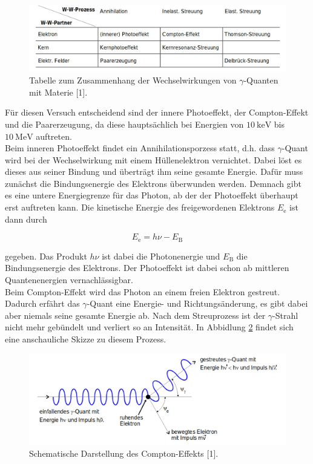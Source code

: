\begin{figure}
  \centering
  \includegraphics[scale=0.3]{content/WW.jpg}
  \caption{Tabelle zum Zusammenhang der Wechselwirkungen von $\gamma$-Quanten mit Materie [1].}
  \label{fig:WW}
\end{figure}

Für diesen Versuch entscheidend sind der innere Photoeffekt, der Compton-Effekt 
und die Paarerzeugung, da diese hauptsächlich bei Energien von $\SI{10}{\kilo\eV}$ bis 
$\SI{10}{\mega\eV}$ auftreten.\\

Beim inneren Photoeffekt findet ein Annihilationsporzess statt, d.h. dass 
$\gamma$-Quant wird bei der Wechselwirkung mit einem Hüllenelektron vernichtet. Dabei 
löst es dieses aus seiner Bindung und überträgt ihm seine gesamte Energie. Dafür 
muss zunächst die Bindungsenergie des Elektrons überwunden werden. Demnach gibt es 
eine untere Energiegrenze für das Photon, ab der der Photoeffekt überhaupt erst 
auftreten kann. Die kinetische Energie des freigewordenen Elektrons $E_\text{e}$ ist 
dann durch 

\begin{equation*}
E_\text{e} = h\nu -E_\text{B}
\end{equation*}

gegeben. Das Produkt $h\nu$ ist dabei die Photonenergie und $E_\text{B}$ die 
Bindungsenergie des Elektrons. Der Photoeffekt ist dabei schon ab mittleren 
Quantenenergien vernachlässigbar.\\
Beim Compton-Effekt wird das Photon an einem freien Elektron gestreut. Dadurch 
erfährt das $\gamma$-Quant eine Energie- und Richtungsänderung, es gibt dabei 
aber niemals seine gesamte Energie ab. Nach dem Streuprozess ist der $\gamma$-Strahl 
nicht mehr gebündelt und verliert so an Intensität. In Abbidlung \ref{fig:com} findet sich eine 
anschauliche Skizze zu diesem Prozess.

\begin{figure}
  \centering
  \includegraphics[scale=0.3]{content/com.jpg}
  \caption{Schematische Darstellung des Compton-Effekts [1].}
  \label{fig:com}
\end{figure}

